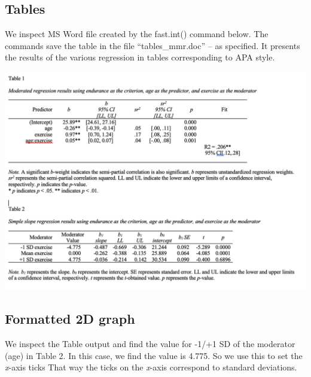 \documentclass[
]{krantz}
\begin{document}
\hypertarget{tables}{%
\subsection{Tables}\label{tables}}

We inspect MS Word file created by the fast.int() command below. The commands save the table in the file ``tables\_mmr.doc'' -- as specified. It presents the results of the various regression in tables corresponding to APA style.

\includegraphics[width=0.8\linewidth]{ch_mmr/images/tables_apa}

\hypertarget{formatted-2d-graph}{%
\subsection{Formatted 2D graph}\label{formatted-2d-graph}}

We inspect the Table output and find the value for -1/+1 SD of the moderator (age) in Table 2. In this case, we find the value is 4.775. So we use this to set the \emph{x}-axis ticks That way the ticks on the \emph{x}-axis correspond to standard deviations.
\end{document}
